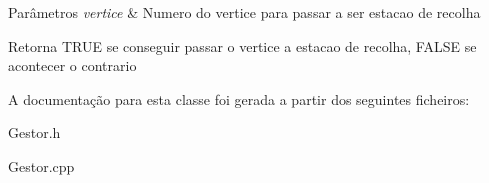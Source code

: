 \begin{DoxyParams}{Parâmetros}
{\em vertice} & Numero do vertice para passar a ser estacao de recolha \\
\hline
\end{DoxyParams}
\begin{DoxyReturn}{Retorna}
T\-R\-U\-E se conseguir passar o vertice a estacao de recolha, F\-A\-L\-S\-E se acontecer o contrario 
\end{DoxyReturn}


A documentação para esta classe foi gerada a partir dos seguintes ficheiros\-:\begin{DoxyCompactItemize}
\item 
Gestor.\-h\item 
Gestor.\-cpp\end{DoxyCompactItemize}
